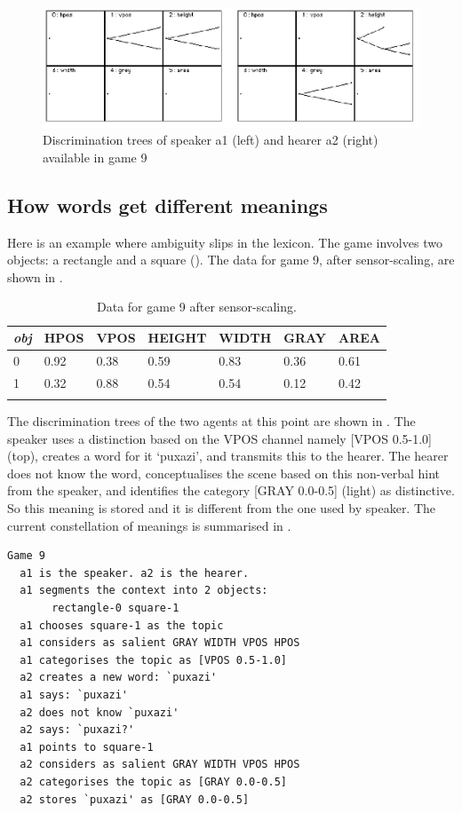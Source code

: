 \begin{figure}[htbp]
  \centerline{\includegraphics[width=.80\textwidth]{chap6/figs/discri-game9}}
\caption{\label{discri-game9} Discrimination trees
of speaker a1 (left) and hearer a2 (right) available 
in game 9}
\end{figure}

\subsection{How words get different meanings}

Here is an example where ambiguity slips in 
the lexicon. The game involves two 
objects: a rectangle and a square (). 
The data for game 9, after sensor-scaling, are
shown in .  


\begin{table}
\begin{center}
\begin{tabular}{ l  l  l  l  l  l  l }
\lsptoprule
{\itshape obj} & HPOS & VPOS & HEIGHT & WIDTH & GRAY & AREA \\ \midrule
0 & 0.92 & 0.38 & 0.59 & 0.83 & 0.36 & 0.61\\ 
1 & 0.32 & 0.88 & 0.54 & 0.54 & 0.12 & 0.42\\ 
\lspbottomrule
\end{tabular}
\caption{\label{tab:different} Data for game 9 after sensor-scaling.}
\end{center}
\end{table}
The discrimination trees of the two agents at this point
are shown in . 
The speaker uses a distinction based on the 
VPOS channel namely [VPOS 0.5-1.0] (top), creates
a word for it `puxazi', and transmits this to the hearer. 
The hearer does not know the word,
conceptualises the scene based on this non-verbal
hint from the speaker, and identifies the category
{}[GRAY 0.0-0.5] (light) as distinctive. So this 
meaning is stored and it is different from the one used by 
speaker. The current constellation of meanings
is summarised in . 
\begin{verbatim}
Game 9
  a1 is the speaker. a2 is the hearer. 
  a1 segments the context into 2 objects: 
       rectangle-0 square-1 
  a1 chooses square-1 as the topic 
  a1 considers as salient GRAY WIDTH VPOS HPOS 
  a1 categorises the topic as [VPOS 0.5-1.0]
  a2 creates a new word: `puxazi'
  a1 says: `puxazi'
  a2 does not know `puxazi'
  a2 says: `puxazi?'
  a1 points to square-1
  a2 considers as salient GRAY WIDTH VPOS HPOS 
  a2 categorises the topic as [GRAY 0.0-0.5]
  a2 stores `puxazi' as [GRAY 0.0-0.5]
\end{verbatim}


